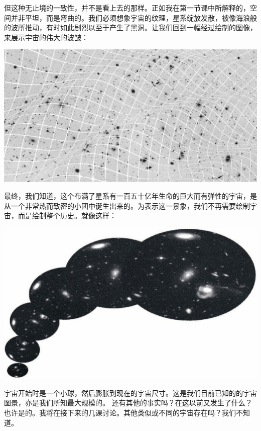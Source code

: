     但这种无止境的一致性，并不是看上去的那样。正如我在第一节课中所解释的，空间并非平坦，而是弯曲的。我们必须想象宇宙的纹理，星系绽放发散，被像海浪般的波所推动，有时如此剧烈以至于产生了黑洞。让我们回到一幅经过绘制的图像，来展示宇宙的伟大的波皱：

	\bc
	\includegraphics[width=.9\textwidth]{img/37.jpg}\\[12pt]
	\ec

    最终，我们知道，这个布满了星系有一百五十亿年生命的巨大而有弹性的宇宙，是从一个非常热而致密的小团中诞生出来的。为表示这一景象，我们不再需要绘制宇宙，而是绘制整个历史。就像这样：

	\bc
	\includegraphics[width=.9\textwidth]{img/38.jpg}\\[12pt]
	\ec

    宇宙开始时是一个小球，然后膨胀到现在的宇宙尺寸。这是我们目前已知的的宇宙图景，亦是我们所知最大规模的。 还有其他的事实吗？在这以前又发生了什么？也许是的。我将在接下来的几课讨论。其他类似或不同的宇宙存在吗？我们不知道。

\noindent
